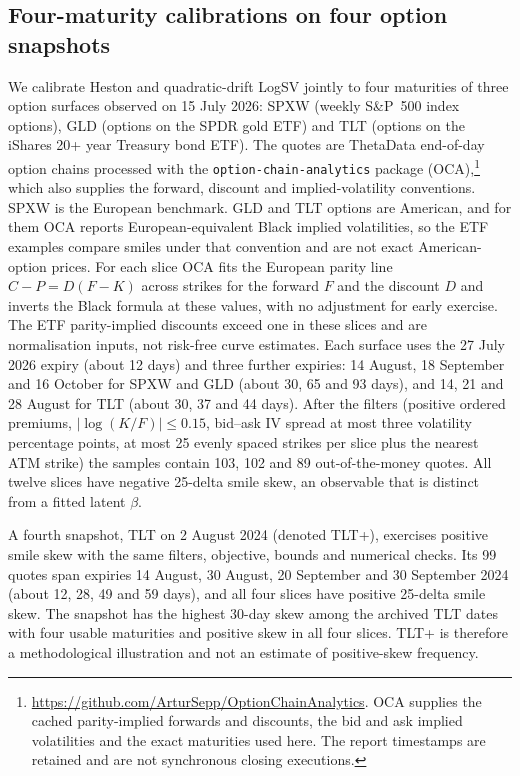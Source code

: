 \documentclass[11pt,a4paper]{article}
\theoremstyle{definition}
\theoremstyle{remark}
\newcommand{\ReplicationBlock}[2]{\ignorespaces}
\begin{document}
\ReplicationBlock{begin}{calibration_section.tex}
\subsection{Four-maturity calibrations on four option snapshots}
\label{sec:oca-calibration}
We calibrate Heston and quadratic-drift LogSV jointly to four maturities of three
option surfaces observed on 15 July 2026: SPXW (weekly S\&P~500 index options), GLD
(options on the SPDR gold ETF) and TLT (options on the iShares 20+ year Treasury
bond ETF). The quotes are
ThetaData end-of-day option chains processed with the \texttt{option-chain-analytics}
package (OCA),\footnote{\url{https://github.com/ArturSepp/OptionChainAnalytics}. OCA
supplies the cached parity-implied forwards and discounts, the bid and ask implied
volatilities and the exact maturities used here. The report timestamps are
retained and are not synchronous closing executions.} which also supplies the
forward, discount and implied-volatility conventions. SPXW is the European
benchmark. GLD and TLT options are American, and for them OCA reports
European-equivalent Black implied volatilities, so the ETF examples compare smiles
under that convention and are not exact American-option prices. For each slice OCA
fits the European parity line $C-P=D(F-K)$ across strikes for the forward $F$ and
the discount $D$ and inverts the Black formula at these values, with no adjustment
for early exercise.
The ETF parity-implied
discounts exceed one in these slices and are normalisation inputs, not risk-free
curve estimates. Each surface uses the 27 July 2026 expiry (about 12 days) and
three further expiries: 14 August, 18 September and 16 October for SPXW and GLD
(about 30, 65 and 93 days), and 14, 21 and 28 August for TLT (about 30, 37 and 44
days). After the filters (positive ordered premiums, $|\log(K/F)|\leq0.15$, bid--ask
IV spread at most three volatility percentage points, at most 25 evenly spaced
strikes per slice plus the nearest ATM strike) the samples contain 103, 102 and 89
out-of-the-money quotes. All twelve slices have negative 25-delta smile skew, an
observable that is distinct from a fitted latent $\beta$.

A fourth snapshot, TLT on 2 August 2024 (denoted TLT+), exercises positive smile
skew with the same filters, objective, bounds and numerical checks. Its 99 quotes
span expiries 14 August, 30 August, 20 September and 30 September 2024 (about
12, 28, 49 and 59 days), and all four slices have positive 25-delta smile skew.
The snapshot has the highest 30-day skew among the archived TLT dates with four usable
maturities and positive skew in all four slices. TLT+ is therefore a methodological
illustration and not an estimate of positive-skew frequency.
\end{document}
